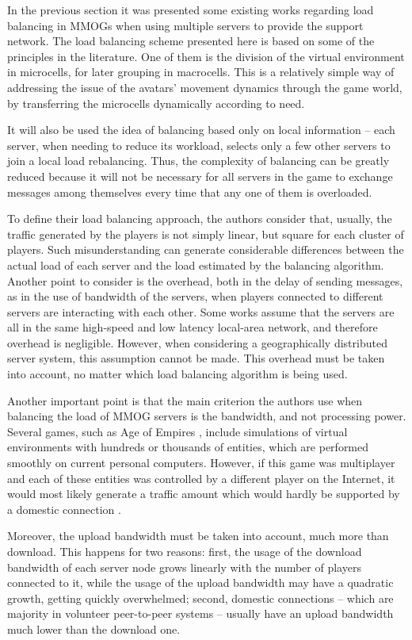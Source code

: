 In the previous section it was presented some existing works regarding load balancing in MMOGs when using multiple servers to provide the support network. The load balancing scheme presented here is based on some of the principles in the literature. One of them is the division of the virtual environment in microcells, for later grouping in macrocells. This is a relatively simple way of addressing the issue of the avatars' movement dynamics through the game world, by transferring the microcells dynamically according to need.

It will also be used the idea of balancing based only on local information -- each server, when needing to reduce its workload, selects only a few other servers to join a local load rebalancing. Thus, the complexity of balancing can be greatly reduced because it will not be necessary for all servers in the game to exchange messages among themselves every time that any one of them is overloaded.

To define their load balancing approach, the authors consider that, usually, the traffic generated by the players is not simply linear, but square for each cluster of players. Such misunderstanding can generate considerable differences between the actual load of each server and the load estimated by the balancing algorithm. Another point to consider is the overhead, both in the delay of sending messages, as in the use of bandwidth of the servers, when players connected to different servers are interacting with each other. Some works assume that the servers are all in the same high-speed and low latency local-area network, and therefore overhead is negligible. However, when considering a geographically distributed server system, this assumption cannot be made. This overhead must be taken into account, no matter which load balancing algorithm is being used.

Another important point is that the main criterion the authors use when balancing the load of MMOG servers is the bandwidth, and not processing power. Several games, such as Age of Empires \cite{ageofempires}, include simulations of virtual environments with hundreds or thousands of entities, which are performed smoothly on current personal computers. However, if this game was multiplayer and each of these entities was controlled by a different player on the Internet, it would most likely generate a traffic amount which would hardly be supported by a domestic connection \cite{feng2007wnn}.

Moreover, the upload bandwidth must be taken into account, much more than download. This happens for two reasons: first, the usage of the download bandwidth of each server node grows linearly with the number of players connected to it, while the usage of the upload bandwidth may have a quadratic growth, getting quickly overwhelmed; second, domestic connections -- which are majority in volunteer peer-to-peer systems -- usually have an upload bandwidth much lower than the download one.

